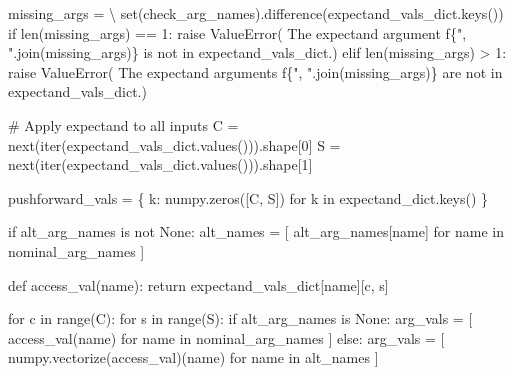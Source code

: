 \documentclass[
  letterpaper,
  DIV=11,
  numbers=noendperiod]{scrartcl}
\newenvironment{Shaded}{\begin{snugshade}}{\end{snugshade}}
\newcommand{\BuiltInTok}[1]{\textcolor[rgb]{0.00,0.23,0.31}{#1}}
\newcommand{\CommentTok}[1]{\textcolor[rgb]{0.37,0.37,0.37}{#1}}
\newcommand{\ControlFlowTok}[1]{\textcolor[rgb]{0.00,0.23,0.31}{#1}}
\newcommand{\DecValTok}[1]{\textcolor[rgb]{0.68,0.00,0.00}{#1}}
\newcommand{\KeywordTok}[1]{\textcolor[rgb]{0.00,0.23,0.31}{#1}}
\newcommand{\NormalTok}[1]{\textcolor[rgb]{0.00,0.23,0.31}{#1}}
\newcommand{\OperatorTok}[1]{\textcolor[rgb]{0.37,0.37,0.37}{#1}}
\newcommand{\PreprocessorTok}[1]{\textcolor[rgb]{0.68,0.00,0.00}{#1}}
\newcommand{\SpecialCharTok}[1]{\textcolor[rgb]{0.37,0.37,0.37}{#1}}
\newcommand{\SpecialStringTok}[1]{\textcolor[rgb]{0.13,0.47,0.30}{#1}}
\newcommand{\StringTok}[1]{\textcolor[rgb]{0.13,0.47,0.30}{#1}}
\newcommand{\VariableTok}[1]{\textcolor[rgb]{0.07,0.07,0.07}{#1}}
\begin{document}
\begin{Shaded}
\begin{Highlighting}[]
\NormalTok{  missing\_args }\OperatorTok{=} \OperatorTok{\textbackslash{}}
    \BuiltInTok{set}\NormalTok{(check\_arg\_names).difference(expectand\_vals\_dict.keys())}
  \ControlFlowTok{if} \BuiltInTok{len}\NormalTok{(missing\_args) }\OperatorTok{==} \DecValTok{1}\NormalTok{:}
    \ControlFlowTok{raise} \PreprocessorTok{ValueError}\NormalTok{( }\StringTok{\textquotesingle{}The expectand argument \textquotesingle{}}
                     \SpecialStringTok{f\textquotesingle{}}\SpecialCharTok{\{}\StringTok{", "}\SpecialCharTok{.}\NormalTok{join(missing\_args)}\SpecialCharTok{\}}\SpecialStringTok{ is not in \textquotesingle{}}
                      \StringTok{\textquotesingle{}\textasciigrave{}expectand\_vals\_dict\textasciigrave{}.\textquotesingle{}}\NormalTok{)}
  \ControlFlowTok{elif} \BuiltInTok{len}\NormalTok{(missing\_args) }\OperatorTok{\textgreater{}} \DecValTok{1}\NormalTok{:}
    \ControlFlowTok{raise} \PreprocessorTok{ValueError}\NormalTok{( }\StringTok{\textquotesingle{}The expectand arguments \textquotesingle{}}
                     \SpecialStringTok{f\textquotesingle{}}\SpecialCharTok{\{}\StringTok{", "}\SpecialCharTok{.}\NormalTok{join(missing\_args)}\SpecialCharTok{\}}\SpecialStringTok{ are not in \textquotesingle{}}
                      \StringTok{\textquotesingle{}\textasciigrave{}expectand\_vals\_dict\textasciigrave{}.\textquotesingle{}}\NormalTok{)}

  \CommentTok{\# Apply expectand to all inputs}
\NormalTok{  C }\OperatorTok{=} \BuiltInTok{next}\NormalTok{(}\BuiltInTok{iter}\NormalTok{(expectand\_vals\_dict.values())).shape[}\DecValTok{0}\NormalTok{]}
\NormalTok{  S }\OperatorTok{=} \BuiltInTok{next}\NormalTok{(}\BuiltInTok{iter}\NormalTok{(expectand\_vals\_dict.values())).shape[}\DecValTok{1}\NormalTok{]}

\NormalTok{  pushforward\_vals }\OperatorTok{=}\NormalTok{ \{ k: numpy.zeros([C, S])}
                       \ControlFlowTok{for}\NormalTok{ k }\KeywordTok{in}\NormalTok{ expectand\_dict.keys() \}}

  \ControlFlowTok{if}\NormalTok{ alt\_arg\_names }\KeywordTok{is} \KeywordTok{not} \VariableTok{None}\NormalTok{:}
\NormalTok{    alt\_names }\OperatorTok{=}\NormalTok{ [ alt\_arg\_names[name]}
                  \ControlFlowTok{for}\NormalTok{ name }\KeywordTok{in}\NormalTok{ nominal\_arg\_names ]}

  \KeywordTok{def}\NormalTok{ access\_val(name):}
    \ControlFlowTok{return}\NormalTok{ expectand\_vals\_dict[name][c, s]}

  \ControlFlowTok{for}\NormalTok{ c }\KeywordTok{in} \BuiltInTok{range}\NormalTok{(C):}
    \ControlFlowTok{for}\NormalTok{ s }\KeywordTok{in} \BuiltInTok{range}\NormalTok{(S):}
      \ControlFlowTok{if}\NormalTok{ alt\_arg\_names }\KeywordTok{is} \VariableTok{None}\NormalTok{:}
\NormalTok{        arg\_vals }\OperatorTok{=}\NormalTok{ [ access\_val(name)}
                     \ControlFlowTok{for}\NormalTok{ name }\KeywordTok{in}\NormalTok{ nominal\_arg\_names ]}
      \ControlFlowTok{else}\NormalTok{:}
\NormalTok{        arg\_vals }\OperatorTok{=}\NormalTok{ [ numpy.vectorize(access\_val)(name)}
                     \ControlFlowTok{for}\NormalTok{ name }\KeywordTok{in}\NormalTok{ alt\_names ]}


\end{Highlighting}
\end{Shaded}
\end{document}
